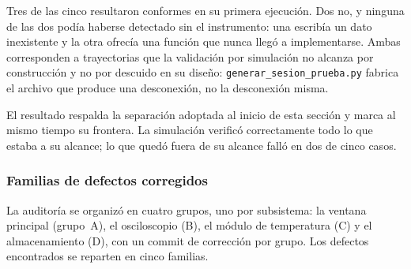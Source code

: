 Tres de las cinco resultaron conformes en su primera ejecución. Dos no,
y ninguna de las dos podía haberse detectado sin el instrumento: una
escribía un dato inexistente y la otra ofrecía una función que nunca
llegó a implementarse. Ambas corresponden a trayectorias que la
validación por simulación no alcanza por construcción y no por descuido
en su diseño: \texttt{generar\_sesion\_prueba.py} fabrica el archivo
que produce una desconexión, no la desconexión misma.

El resultado respalda la separación adoptada al inicio de esta sección
y marca al mismo tiempo su frontera. La simulación verificó
correctamente todo lo que estaba a su alcance; lo que quedó fuera de su
alcance falló en dos de cinco casos.


\subsubsection*{Familias de defectos corregidos}

La auditoría se organizó en cuatro grupos, uno por subsistema: la
ventana principal (grupo~A), el osciloscopio (B), el módulo de
temperatura (C) y el almacenamiento (D), con un commit de corrección
por grupo. Los defectos encontrados se reparten en cinco familias.

